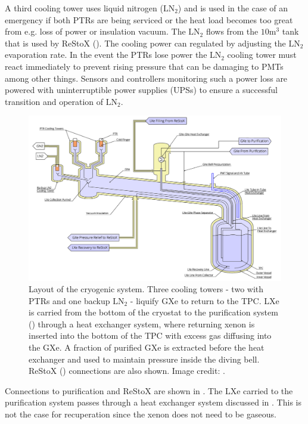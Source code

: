 A third cooling tower uses liquid nitrogen ($\mathrm{LN_2}$) and is used in the case of an emergency if both PTRs are being serviced or the
heat load becomes too great from e.g. loss of power or insulation vacuum.  The $\mathrm{LN_2}$ flows from the $10 \mathrm{m^3}$ tank that
is used by ReStoX ().  The cooling power can regulated by adjusting the $\mathrm{LN_2}$ evaporation rate.  In the event the PTRs
lose power the $\mathrm{LN_2}$ cooling tower must react immediately to prevent rising pressure that can be damaging to PMTs among other
things.  Sensors and controllers monitoring such a power loss are powered with uninterruptible power supplies (UPSs) to ensure a successful
transition and operation of $\mathrm{LN_2}$.

\begin{figure}
\centering
\includegraphics[width=\textwidth]{CryostatSchematic}
\caption{Layout of the cryogenic system.  Three cooling towers - two with PTRs and one backup $\mathrm{LN_2}$ - liquify GXe to return to
the TPC.  LXe is carried from the bottom of the cryostat to the purification system () through a heat
exchanger system, where
returning xenon is inserted into the bottom of the TPC with excess gas diffusing into the GXe.  A fraction of purified GXe is extracted
before the heat exchanger and used to maintain pressure inside the diving bell.  ReStoX () connections are
also shown.  Image credit: .}
\label{fig:xenon1t_cryogenics_schematic}
\end{figure}

Connections to purification and ReStoX are shown in .  The LXe carried to the purification system
passes through a heat exchanger system discussed in .  This is not the case for recuperation since the xenon
does not need to be gaseous.

